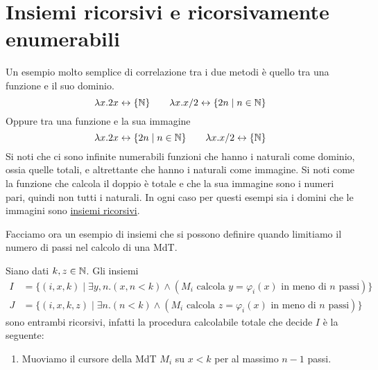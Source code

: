 \section{Insiemi ricorsivi e ricorsivamente enumerabili}
Un esempio molto semplice di correlazione tra i due metodi è
quello tra una funzione e il suo dominio.
\[
	\lambda x . 2 x \leftrightarrow \{ \mathbb{N} \} \qquad
	\lambda x . x / 2 \leftrightarrow \{ 2n \mid n \in \mathbb{N} \}
\]
Oppure tra una funzione e la sua immagine
\[
	\lambda x . 2 x \leftrightarrow \{ 2 n \mid n \in \mathbb{N} \}
	\qquad \lambda x . x / 2 \leftrightarrow \{ \mathbb{N} \}
\]
Si noti che ci sono infinite numerabili funzioni che hanno i
naturali come dominio, ossia quelle totali, e altrettante che
hanno i naturali come immagine. Si noti come la funzione che
calcola il doppio è totale e che la sua immagine sono i numeri
pari, quindi non tutti i naturali. In ogni caso per questi
esempi sia i domini che le immagini sono
\hyperref[def: relazione ricorsiva]{insiemi ricorsivi}.

Facciamo ora un esempio di insiemi che si possono definire
quando limitiamo il numero di passi nel calcolo di una MdT.

\begin{example}
	Siano dati $k, z \in \mathbb{N}$. Gli insiemi
	\begin{align*}
		I & = \{ (i, x, k) \mid \exists y, n . (x,n < k)
		\land (M_i \text{ calcola } y = \varphi_i (x)
		\text{ in meno di } n \text{ passi}) \}          \\
		J & = \{ (i,x,k,z) \mid \exists n . (n < k)
		\land (M_i \text{ calcola } z = \varphi_i (x)
		\text{ in meno di } n \text{ passi}) \}
	\end{align*}
	sono entrambi ricorsivi, infatti la procedura calcolabile
	totale che decide $I$ è la seguente:
	\begin{enumerate}
		\item Muoviamo il cursore della MdT $M_i$ su $x < k$
		      per al massimo $n-1$ passi.
	\end{enumerate}
\end{example}

